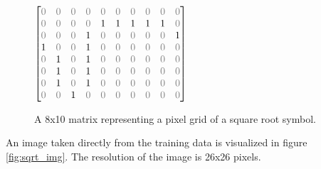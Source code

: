 \begin{figure}[H]
    \begin{center}
    $
    \begin{bmatrix} %
        \textcolor{gray}{0} & \textcolor{gray}{0} & \textcolor{gray}{0} & \textcolor{gray}{0} & \textcolor{gray}{0} & \textcolor{gray}{0} & \textcolor{gray}{0} & \textcolor{gray}{0} & \textcolor{gray}{0} & \textcolor{gray}{0} \\
        \textcolor{gray}{0} & \textcolor{gray}{0} & \textcolor{gray}{0} & \textcolor{gray}{0} & 1 & 1 & 1 & 1 & 1 & \textcolor{gray}{0} \\
        \textcolor{gray}{0} & \textcolor{gray}{0} & \textcolor{gray}{0} & 1 & \textcolor{gray}{0} & \textcolor{gray}{0} & \textcolor{gray}{0} & \textcolor{gray}{0} & \textcolor{gray}{0} & 1 \\
        1 & \textcolor{gray}{0} & \textcolor{gray}{0} & 1 & \textcolor{gray}{0} & \textcolor{gray}{0} & \textcolor{gray}{0} & \textcolor{gray}{0} & \textcolor{gray}{0} & \textcolor{gray}{0} \\
        \textcolor{gray}{0} & 1 & \textcolor{gray}{0} & 1 & \textcolor{gray}{0} & \textcolor{gray}{0} & \textcolor{gray}{0} & \textcolor{gray}{0} & \textcolor{gray}{0} & \textcolor{gray}{0} \\
        \textcolor{gray}{0} & 1 & \textcolor{gray}{0} & 1 & \textcolor{gray}{0} & \textcolor{gray}{0} & \textcolor{gray}{0} & \textcolor{gray}{0} & \textcolor{gray}{0} & \textcolor{gray}{0} \\
        \textcolor{gray}{0} & 1 & \textcolor{gray}{0} & 1 & \textcolor{gray}{0} & \textcolor{gray}{0} & \textcolor{gray}{0} & \textcolor{gray}{0} & \textcolor{gray}{0} & \textcolor{gray}{0} \\
        \textcolor{gray}{0} & \textcolor{gray}{0} & 1 & \textcolor{gray}{0} & \textcolor{gray}{0} & \textcolor{gray}{0} & \textcolor{gray}{0} & \textcolor{gray}{0} & \textcolor{gray}{0} & \textcolor{gray}{0} \\

    \end{bmatrix}
    $
    \end{center}
    \caption{A 8x10 matrix representing a pixel grid of a square root symbol.} %
    \label{fig:sqrt_matrix}
\end{figure}

An image taken directly from the training data is visualized in figure \ref{fig:sqrt_img}. The resolution of the image is 26x26 pixels.

